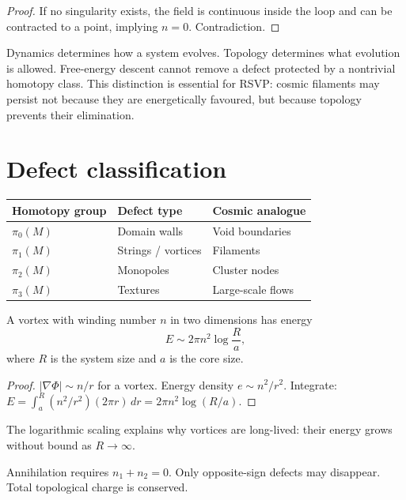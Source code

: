 \begin{proof}
  If no singularity exists, the field is continuous inside the
  loop and can be contracted to a point, implying $n = 0$.
  Contradiction.
\end{proof}

\begin{TechNote}
  Dynamics determines how a system evolves.
  Topology determines what evolution is allowed.
  Free-energy descent cannot remove a defect protected by a
  nontrivial homotopy class.
  This distinction is essential for RSVP: cosmic filaments
  may persist not because they are energetically favoured,
  but because topology prevents their elimination.
\end{TechNote}

\section{Defect classification}

\begin{center}
\begin{tabular}{@{}lll@{}}
\toprule
\textbf{Homotopy group} & \textbf{Defect type} & \textbf{Cosmic analogue} \\
\midrule
$\pi_0(M)$ & Domain walls & Void boundaries \\
$\pi_1(M)$ & Strings / vortices & Filaments \\
$\pi_2(M)$ & Monopoles & Cluster nodes \\
$\pi_3(M)$ & Textures & Large-scale flows \\
\bottomrule
\end{tabular}
\end{center}

\begin{proposition}
  A vortex with winding number $n$ in two dimensions has energy
  \[
    E \sim 2\pi n^2 \log\frac{R}{a},
  \]
  where $R$ is the system size and $a$ is the core size.
\end{proposition}

\begin{proof}
  $|\nabla\Phi| \sim n/r$ for a vortex.
  Energy density $e \sim n^2/r^2$.
  Integrate: $E = \int_a^R (n^2/r^2)(2\pi r)\,dr
  = 2\pi n^2 \log(R/a)$.
\end{proof}

The logarithmic scaling explains why vortices are long-lived:
their energy grows without bound as $R \to \infty$.

\begin{theorem}
  Annihilation requires $n_1 + n_2 = 0$.
  Only opposite-sign defects may disappear.
  Total topological charge is conserved.
\end{theorem}

